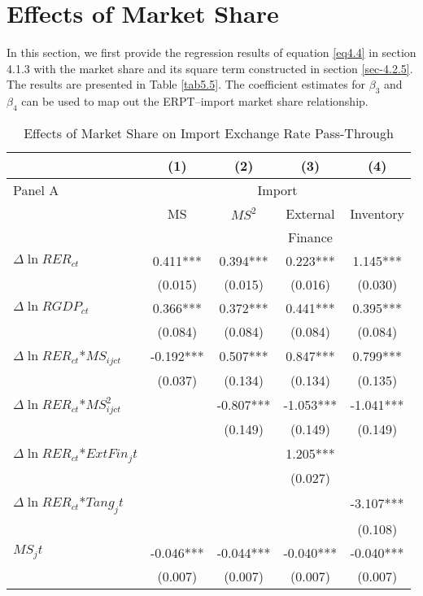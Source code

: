 \section{Effects of Market Share}

In this section, we first provide the regression results of equation \ref{eq4.4} in section 4.1.3 with the market share and its square term constructed in section \ref{sec-4.2.5}. The results are presented in Table \ref{tab5.5}. The coefficient estimates for $\beta_3$ and $\beta_4$ can be used to map out the ERPT–import market share relationship.

\begin{table}[tbp]
	\centering
	\caption{Effects of Market Share on Import Exchange Rate Pass-Through}
	\begin{threeparttable}
	\begin{tabular}{lcccc}
		\toprule
		& (1)   & (2)   & (3)   & (4) \\
		\midrule
		Panel A & \multicolumn{4}{c}{Import} \\
		& MS    & $MS^2$ & External & Inventory \\
		&       &       & Finance &  \\
		\midrule
		$\Delta \ln RER_{ct}$ & 0.411*** & 0.394*** & 0.223*** & 1.145*** \\
		& (0.015) & (0.015) & (0.016) & (0.030) \\
		$\Delta \ln RGDP_{ct}$ & 0.366*** & 0.372*** & 0.441*** & 0.395*** \\
		& (0.084) & (0.084) & (0.084) & (0.084) \\
		$\Delta \ln RER_{ct}$*$MS_{ijct}$ & -0.192*** & 0.507*** & 0.847*** & 0.799*** \\
		& (0.037) & (0.134) & (0.134) & (0.135) \\
		$\Delta \ln RER_{ct}$*$MS_{ijct}^2$ &       & -0.807*** & -1.053*** & -1.041*** \\
		&       & (0.149) & (0.149) & (0.149) \\
		$\Delta \ln RER_{ct}$*$ExtFin_jt$ &       &       & 1.205*** &  \\
		&       &       & (0.027) &  \\
		$\Delta \ln RER_{ct}$*$Tang_jt$ &       &       &       & -3.107*** \\
		&       &       &       & (0.108) \\
		$MS_jt$ & -0.046*** & -0.044*** & -0.040*** & -0.040*** \\
		 & (0.007) & (0.007) & (0.007) & (0.007) \\

\end{tabular}
\end{threeparttable}
\end{table}
